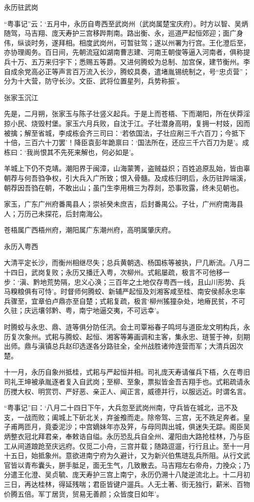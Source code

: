 \documentclass[]{article}
\begin{document}
永历驻武岗

``粤事记''云：`五月中，永历自粤西至武岗州（武岗属楚宝庆府）。时方以智、吴炳随驾，马吉翔、庞天寿护三宫移跸荆南。路出衡、永，巡道严起恒郊迎；面广身伟，纵谈时务，遂拜相。相度武岗州，可暂驻驾；遂以州署为行宫。王化澄后至，亦协理阁务。百日间，先朝流寇如湖南曹志建、河南王朝俊等逼入河南者，俱称提兵十万、五万来归宇下；悉赐五等爵。又进何腾蛟为总制、加宫保，建节衡州。李自成余党高必正等声言百万流入长沙，腾蛟具奏，遣堵胤锡统制之，号``忠贞营''；分为十大营，防守长沙。文臣、武将位置星列，兵势称振'。

张家玉沉江

先是，二月朔，张家玉与陈子壮竖义起兵。于是上而苍梧、下而潮阳，所在伏莽淫掠小民、烧毁村堡。家玉六月兵败，自沈于江。子壮潜身高明，复拥一村妓，因而被擒；解至省城，李成栋会齐三司曰：`若依国法，子壮应剐三千六百刀；今抵下十倍，三百六十刀罢'！降臣袁彭年跪禀曰：`国法所在，还应三千六百刀为是'。成栋曰：`我尚恨其不先死来解也，何必如是'。

羊城上下仍不克靖。潮阳界于闽漳，山海蒙箐，盗贼益炽；百姓追原乱始，皆由辜朝荐与何吾驺争权，引大兵入广所致；恨入骨髓。及成栋归明后，永历驻跸端溪，朝荐因吾驺在朝，不敢出山；虽门生李用楫三为荐剡，恐事败露，终未见朝也。

家玉，广东广州府番禺县人；崇祯癸未庶吉，后封番禺公。子壮，广州府南海县人；万历己未探花，后封南海公。

苍梧属广西梧州府，潮阳属广东潮州府，高明属肇庆府。

永历入粤西

大清平定长沙，而衡州相继尽失；总兵黄朝选、杨国栋等被执，尸几断流。八月二十四日，武岗复败；永历又播迁入粤，次柳州。式耜屡疏，极言不可他移一步：`滇、黔地荒势隔，忠义心涣；三百年之土地仅存粤西一线，且山川形势、兵马糗粮俱有可恃'。时督师何腾蛟、新辅严起恒及刘湘客咸至桂、南安侯郝永忠率兵骤至，宜章伯卢鼎亦至自楚；式耜复疏，极言`柳州猺獞杂处，地瘠民贫，不可久驻；庆远壤邻黔、粤，南宁地逼交夷，不可远幸'。

时腾蛟与永忠、鼎、涟等俱分防任汛。会土司覃裕春子鸣坷与道臣龙文明构兵，永历复次象州。式耜与腾蛟、起恒、湘客等筹画调和主客，集永忠、琏誓于神，刻期出师。鼎与滇镇总兵赵印选遂各分路驻全，全州战胜诸帅连营而军；大清兵因次楚。

十一月，永历自象州抵桂，式耜与严起恒并相。司礼庞天寿请催兵下梧，久在粤旧司礼王坤被承胤逐者复入自武岗；至柳、至象，票拟皆金吾吉翔手也。式耜疏请永历搅大权、明赏罚、严好恶、亲正人、闻正言，威德并行，以服远近。时谓名言。

``粤事记''曰：`八月二十四日下午，大兵忽至武岗州南，守兵皆在城北，迅不及支，一战而败；阖城上下斫北关，弃釜飧而走。除帝驾、三宫，无不跣足奔者。皇子甫两匝月，竟委泥沙；中宫嫡妹年亦及笄，与母同舆出城，俱迷失无踪。阁臣吴炳整衣冠北拜君亲，奉敕诰自缢。永历恐乱兵自全州、灌阳由大路抢桂林，乃与臣工从间道踉跄至庆远府。仅觅二小舟，三宫并载；随路逗遛，行行且止。至十一月十五日，始抵象州。意欲进南宁府为久避计，又为新兴伯焦琏乱兵所阻。从行文武官皆以青布囊头，胼手胝足，面无生气，几致散去。马吉翔左右帝舟，力挽众；乃分遣王化澄、吴贞毓、庞天寿护三宫上南宁，永历仍溯十八陡逆流北上。十二月初三日，再达桂林，得延残喘；君臣皆键户遛兵。人无土著、街无独行，薪米、百物价腾五倍。军丁居货，贸易无善颜；众皆度日如年'。
\end{document}
